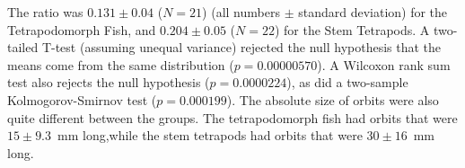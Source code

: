 The ratio was $0.131 \pm 0.04$  ($N=21$) (all numbers $\pm$ standard deviation) for the Tetrapodomorph Fish, and $0.204 \pm  0.05$ ($N=22$) for the Stem Tetrapods. A two-tailed  T-test (assuming unequal variance) rejected the null hypothesis that the means come from the same distribution ($p = 0.00000570$). A Wilcoxon rank sum test also rejects the null hypothesis ($p = 0.0000224$), as did a two-sample Kolmogorov-Smirnov test ($p = 0.000199$).  The absolute size of orbits were also quite different between the groups. The tetrapodomorph fish had orbits that were $15 \pm 9.3$~mm long,while the stem tetrapods had orbits that were $30 \pm 16$~mm long.